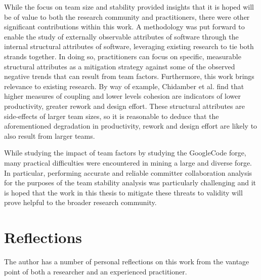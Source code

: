 While the focus on team size and stability provided insights that it is hoped will be of value to both the research community and practitioners, there were other significant contributions within this work. A methodology was put forward to enable the study of externally observable attributes of software through the internal structural attributes of software, leveraging existing research to tie both strands together. In doing so, practitioners can focus on specific, measurable structural attributes as a mitigation strategy against some of the observed negative trends that can result from team factors. Furthermore, this work brings relevance to existing research. By way of example, Chidamber et al. \citep{chidamber1998managerial} find that higher measures of coupling and lower levels cohesion are indicators of lower productivity, greater rework and design effort. These structural attributes are side-effects of larger team sizes, so it is reasonable to deduce that the aforementioned degradation in productivity, rework and design effort are likely to also result from larger teams.

While studying the impact of team factors by studying the GoogleCode forge, many practical difficulties were encountered in mining a large and diverse forge. In particular, performing accurate and reliable committer collaboration analysis for the purposes of the team stability analysis was particularly challenging and it is hoped that the work in this thesis to mitigate these threats to validity will prove helpful to the broader research community. 

\section{Reflections} %
The author has a number of personal reflections on this work from the vantage point of both a researcher and an experienced practitioner.

